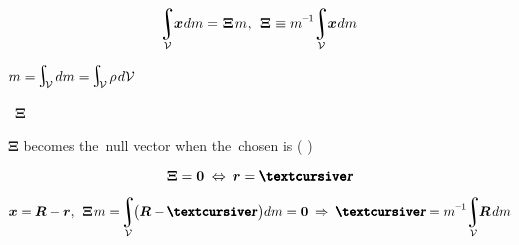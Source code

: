 \[
\hspace{-0.4ex} \integral_{\mathcal{V}} \hspace{-0.6ex} \bm{x} \hspace{.1ex} dm = \hspace{.15ex} \bm{\Xi} \hspace{.2ex} m
\hspace{.1ex} , \:\:
\bm{\Xi} \hspace{.1ex} \equiv m^{\hspace{-0.1ex}\expminusone} \hspace{-0.5ex} \integral_{\mathcal{V}} \hspace{-0.6ex} \bm{x} \hspace{.1ex} dm
\]

 ${m = \hspace{-0.25ex}\scalebox{1.4}{$\integral$}_{\hspace{-0.55ex}\mathcal{V}} \hspace{.3ex} dm = \hspace{-0.25ex}\scalebox{1.4}{$\integral$}_{\hspace{-0.55ex}\mathcal{V}} \hspace{.3ex} \rho \hspace{.2ex} d\mathcal{V}}$

\hbox{~\hspace{.2ex}}$\bm{\Xi}$

$\bm{\Xi}$ becomes the~null vector when the~chosen  is  ( )

\[
\bm{\Xi} = \bm{0}
\hspace{.6ex} \Leftrightarrow \hspace{.5ex}
\bm{r} = \mathboldrcursive
\]

\[
\bm{x} = \hspace{-0.1ex} \bm{R} - \bm{r}
, \hspace{1ex}
\bm{\Xi} \hspace{.2ex} m = \hspace{-0.4ex} \integral_{\mathcal{V}} \hspace{-0.4ex} \bigl( \bm{R} - \hspace{-0.1ex} \mathboldrcursive \hspace{.15ex} \bigr) dm = \bm{0}
\hspace{.5ex} \Rightarrow \hspace{.6ex}
\mathboldrcursive = m^{\hspace{-0.1ex}\expminusone} \hspace{-0.5ex} \integral_{\mathcal{V}} \hspace{-0.7ex} \bm{R} \hspace{.25ex} dm
\]

